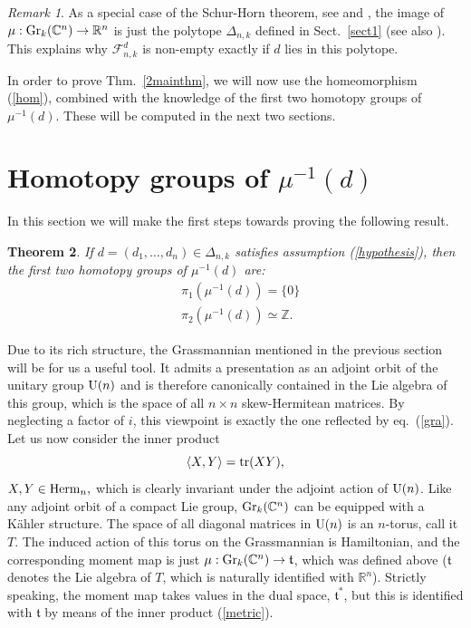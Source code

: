 \documentclass[12pt]{amsart}
\newtheorem{thm}{Theorem}[section]
\theoremstyle{definition}
\theoremstyle{remark}
\newtheorem{rem}[thm]{Remark}
\newcommand{\RR}{\mathbb R}
\newcommand{\ZZ}{\mathbb Z}
\newcommand{\CC}{\mathbb C}
\begin{document}
\begin{rem}\label{sh} As a special case of the Schur-Horn theorem, see \cite{Schur} and \cite{Ho}, the image of $\mu: {\rm Gr}_k(\CC^n) \to \RR^n$ is just the polytope
$\Delta_{n,k}$ defined in Sect.~\ref{sect1} (see also \cite[Sect.~2.2]{Buch}). This explains why ${\mathcal F}_{n,k}^d$ is non-empty exactly if $d$ lies in this polytope.
\end{rem}

In order to prove Thm.~\ref{2mainthm}, we will now use the homeomorphism (\ref{hom}), combined with the knowledge of
the first two homotopy groups of  $\mu^{-1}(d)$. These will be computed in the next two sections. 

\section{Homotopy groups of $\mu^{-1}(d)$}

In this section we will make the first steps towards proving the following result.
\begin{thm}\label{mainthm}  If $d=(d_1, \ldots, d_n)\in \Delta_{n,k}$ satisfies assumption (\ref{hypothesis}), 
 then the first two homotopy groups of
 $\mu^{-1}(d)$ are: 
 \begin{align*}
 {}& \pi_1(\mu^{-1}(d))=\{0\}\\
 {}&   \pi_2(\mu^{-1}(d))\simeq \ZZ.
 \end{align*}
\end{thm}

Due to its rich structure, the Grassmannian mentioned in the previous section will be for us a useful tool. It admits a presentation as an  adjoint
orbit of the unitary group ${\rm U}(n)$ and is therefore canonically contained in the Lie algebra of this group, which is the space of all $n\times n$ skew-Hermitean matrices. By neglecting a factor of $i$, this viewpoint is exactly the one reflected by eq.~(\ref{gra}).
Let us now consider 
 the inner product 
\begin{equation} \label{metric}\langle X, Y\rangle ={\rm tr} (XY),\end{equation} $X, Y\in {\rm Herm}_n,$
  which is clearly invariant under the adjoint action of ${\rm U}(n)$. 
Like any adjoint orbit of a compact Lie group, ${\rm Gr}_k(\CC^n)$ can be equipped with a K\"ahler structure.
The space of all diagonal matrices in ${\rm U}(n)$ is an $n$-torus, call it $T$. The induced action of this torus on the Grassmannian is
Hamiltonian, and the corresponding moment map is just $\mu : {\rm Gr}_k(\CC^n) \to {\mathfrak t} $, which was defined above
(${\mathfrak t}$ denotes the Lie algebra of  $T$, which is naturally identified with ${\mathbb R}^n$).  
Strictly speaking, the moment map takes values in the dual space, ${\mathfrak t}^*$, but this is identified with 
${\mathfrak t}$ by means of the 
inner product (\ref{metric}). %
\end{document}
